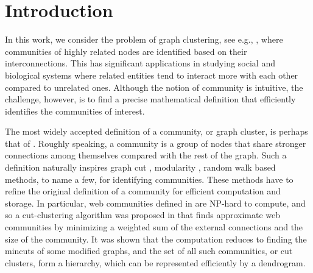 
\section{Introduction}
\label{sec:introduction}


In this work, we consider the problem of graph clustering, see e.g., \cite{fortunato2016community}, where communities of highly related nodes
are identified based on their interconnections. This has significant applications in studying social
and biological systems where related entities tend to interact more with each other compared to
unrelated ones.
Although the notion of community is
intuitive, the challenge, however, is to find a precise mathematical definition that efficiently
identifies the communities of interest.

The most widely accepted definition of a community, or graph cluster, is perhaps that of
\cite{flake:efficient,radicchi:defining,newman2004fast}. Roughly speaking, a community
is a group of nodes  that share
stronger connections among themselves compared with the rest of the graph. Such a definition naturally inspires
 graph cut \cite{flake:cut-clustering,shi2000normalized},
modularity \cite{newman2004fast,blondel2008fast}, random walk \cite{rosvall2008maps} based
methods, to name a few, for identifying communities. These methods have to refine the original
definition of a community for efficient computation and storage. In particular, web communities
defined in \cite{flake:efficient,flake:cut-clustering} are NP-hard to compute, and so a
cut-clustering algorithm was proposed in \cite{flake:cut-clustering} that finds approximate web
communities by minimizing a weighted sum of the external connections and the size of the community.
It was shown that the computation reduces to finding the mincuts of some modified graphs,  and the
set of all such communities, or cut clusters, form a hierarchy, which can be represented efficiently
by a dendrogram.

